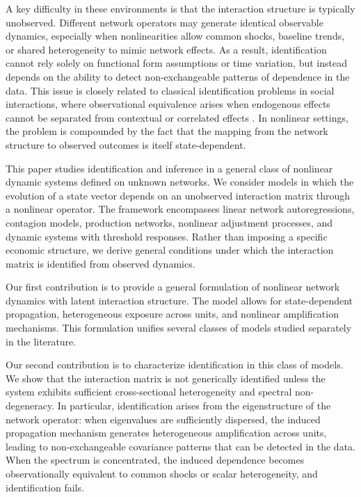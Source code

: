 \documentclass[12pt]{article}
\numberwithin{equation}{section}
\begin{document}
A key difficulty in these environments is that the interaction structure is typically unobserved. Different network operators may generate identical observable dynamics, especially when nonlinearities allow common shocks, baseline trends, or shared heterogeneity to mimic network effects. As a result, identification cannot rely solely on functional form assumptions or time variation, but instead depends on the ability to detect non-exchangeable patterns of dependence in the data. This issue is closely related to classical identification problems in social interactions, where observational equivalence arises when endogenous effects cannot be separated from contextual or correlated effects \citep{manski1993identification}. In nonlinear settings, the problem is compounded by the fact that the mapping from the network structure to observed outcomes is itself state-dependent.

This paper studies identification and inference in a general class of nonlinear dynamic systems defined on unknown networks. We consider models in which the evolution of a state vector depends on an unobserved interaction matrix through a nonlinear operator. The framework encompasses linear network autoregressions, contagion models, production networks, nonlinear adjustment processes, and dynamic systems with threshold responses. Rather than imposing a specific economic structure, we derive general conditions under which the interaction matrix is identified from observed dynamics.

Our first contribution is to provide a general formulation of nonlinear network dynamics with latent interaction structure. The model allows for state-dependent propagation, heterogeneous exposure across units, and nonlinear amplification mechanisms. This formulation unifies several classes of models studied separately in the literature.

Our second contribution is to characterize identification in this class of models. We show that the interaction matrix is not generically identified unless the system exhibits sufficient cross-sectional heterogeneity and spectral non-degeneracy. In particular, identification arises from the eigenstructure of the network operator: when eigenvalues are sufficiently dispersed, the induced propagation mechanism generates heterogeneous amplification across units, leading to non-exchangeable covariance patterns that can be detected in the data. When the spectrum is concentrated, the induced dependence becomes observationally equivalent to common shocks or scalar heterogeneity, and identification fails.
\end{document}
